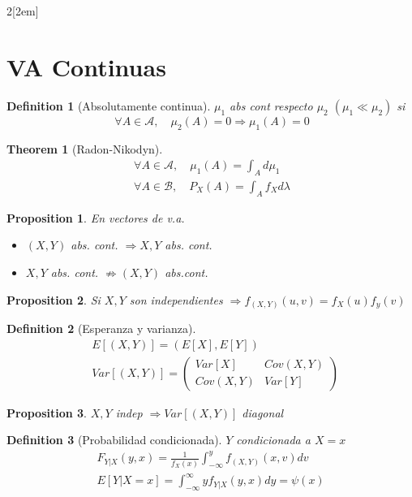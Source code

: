 \documentclass[leqno]{article}
\newtheorem*{theorem}{Theorem}
\newtheorem*{proposition}{Proposition}
\newtheorem*{definition}{Definition}
\begin{document}
\begin{multicols}{2}[\columnsep2em]
\section{VA Continuas}
\begin{definition}[Absolutamente continua] $\mu_1$ abs cont respecto $\mu_2$ $(\mu_1\ll \mu_2)$ si
\[
\ \forall A \in \mathcal{A}, \quad \mu_2(A) = 0 \Rightarrow \mu_1(A)=0
\] 
\end{definition}

\begin{theorem}[Radon-Nikodyn]
\begin{align*}
\ \forall A \in \mathcal{A}, \quad \mu_1(A) = \int_A d\mu_1 \\
\ \forall A \in \mathcal{B}, \quad P_X(A) = \int_A f_Xd\lambda
\end{align*}
\end{theorem}

\begin{proposition} En vectores de v.a.
\begin{itemize}[topsep=-6pt, itemsep=0pt]
  \item $(X, Y)$ abs. cont.  $\Rightarrow X, Y$ abs. cont.
  \item $X, Y$ abs. cont.  $\nRightarrow (X, Y)$ abs.cont.
\end{itemize} 
\end{proposition}

\begin{proposition}
Si $X, Y$ son independientes $\Rightarrow f_{(X, Y)}(u, v) = f_X(u)f_{y}(v)$  
\end{proposition}

\begin{definition}[Esperanza y varianza]
  \begin{align*}
  &E[(X, Y)] = (E[X], E[Y]) \\
  &Var[(X,Y)] = \begin{pmatrix} Var[X] & Cov(X, Y) \\ Cov(X, Y) & Var[Y] \end{pmatrix}
  \end{align*}
\end{definition}

\begin{proposition}
$X, Y$ indep $\Rightarrow Var[(X, Y)]$ diagonal 
\end{proposition}

\begin{definition}[Probabilidad condicionada] $Y$ condicionada a $X = x$ 
  \begin{align*}
F_{Y|X}(y, x) = \frac{1}{f_X(x)} \int_{-\infty}^y f_{(X,Y)}(x,v)dv\\
E[Y|X=x] = \int_{-\infty}^{\infty} yf_{Y|X}(y, x)dy = \psi (x)
  \end{align*}
\end{definition}


\end{multicols}
\end{document}
